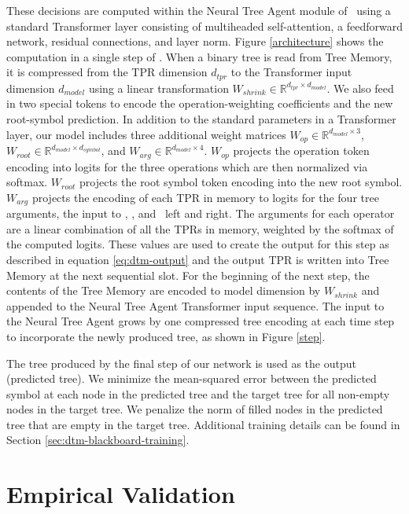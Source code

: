 These decisions are computed within the Neural Tree Agent module of \blackboard\ using a standard Transformer layer \cite{vaswani} consisting of multiheaded self-attention, a feedforward network, residual connections, and layer norm. Figure \ref{architecture} shows the computation in a single step of \blackboard. When a binary tree is read from Tree Memory, it is compressed from the TPR dimension $d_{tpr}$ to the Transformer input dimension $d_{model}$ using a linear transformation $W_{shrink} \in \mathbb{R}^{d_{tpr} \times d_{model}}$. We also feed in two special tokens to encode the operation-weighting coefficients and the new root-symbol prediction. In addition to the standard parameters in a Transformer layer, our model includes three additional weight matrices $W_{op} \in \mathbb{R}^{d_{model} \times 3}$, $W_{root} \in \mathbb{R}^{d_{model} \times d_{symbol}}$, and $W_{arg} \in \mathbb{R}^{d_{model} \times 4}$. $W_{op}$ projects the operation token encoding into logits for the three operations which are then normalized via softmax. $W_{root}$ projects the root symbol token encoding into the new root symbol. $W_{arg}$ projects the encoding of each TPR in memory to logits for the four tree arguments, the input to \car, \cdr, and \cons\ left and right. The arguments for each operator are a linear combination of all the TPRs in memory, weighted by the softmax of the computed logits. These values are used to create the output for this step as described in equation \ref{eq:dtm-output} and the output TPR is written into Tree Memory at the next sequential slot. For the beginning of the next step, the contents of the Tree Memory are encoded to model dimension by $W_{shrink}$ and appended to the Neural Tree Agent Transformer input sequence. The input to the Neural Tree Agent grows by one compressed tree encoding at each time step to incorporate  the newly produced tree, as shown in Figure \ref{step}.

The tree produced by the final step of our network is used as the output (predicted tree). We minimize the mean-squared error between the predicted symbol at each node in the predicted tree and the target tree for all non-empty nodes in the target tree. We penalize the norm of filled nodes in the predicted tree that are empty in the target tree. Additional training details can be found in Section \ref{sec:dtm-blackboard-training}.

\section{Empirical Validation} \label{sec:dtm-empirical}

